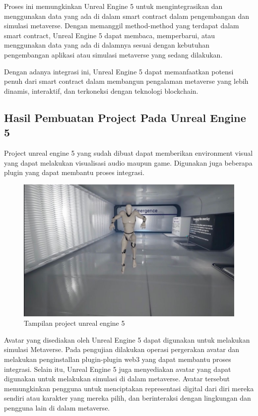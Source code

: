 Proses ini memungkinkan Unreal Engine 5 untuk mengintegrasikan dan menggunakan data yang ada di dalam smart contract dalam pengembangan dan simulasi metaverse. Dengan memanggil method-method yang terdapat dalam smart contract, Unreal Engine 5 dapat membaca, memperbarui, atau menggunakan data yang ada di dalamnya sesuai dengan kebutuhan pengembangan aplikasi atau simulasi metaverse yang sedang dilakukan.

Dengan adanya integrasi ini, Unreal Engine 5 dapat memanfaatkan potensi penuh dari smart contract dalam membangun pengalaman metaverse yang lebih dinamis, interaktif, dan terkoneksi dengan teknologi blockchain.

\subsection{Hasil Pembuatan Project Pada Unreal Engine 5}
Project unreal engine 5 yang sudah dibuat dapat memberikan environment visual yang dapat melakukan visualisasi audio maupun game.
Digunakan juga beberapa plugin yang dapat membantu proses integrasi.

\begin{figure}[H]
  \centering

  \includegraphics[scale=0.35]{gambar/ue5project.jpg}

  \caption{Tampilan project unreal engine 5}
  \label{fig:ue5project}
\end{figure}

Avatar yang disediakan oleh Unreal Engine 5 dapat digunakan untuk melakukan simulasi Metaverse.
Pada pengujian dilakukan operasi pergerakan avatar dan melakukan penginstallan plugin-plugin web3 yang dapat membantu proses integrasi.
Selain itu, Unreal Engine 5 juga menyediakan avatar yang dapat digunakan untuk melakukan simulasi di dalam metaverse. Avatar tersebut memungkinkan pengguna untuk menciptakan representasi digital dari diri mereka sendiri atau karakter yang mereka pilih, dan berinteraksi dengan lingkungan dan pengguna lain di dalam metaverse.

